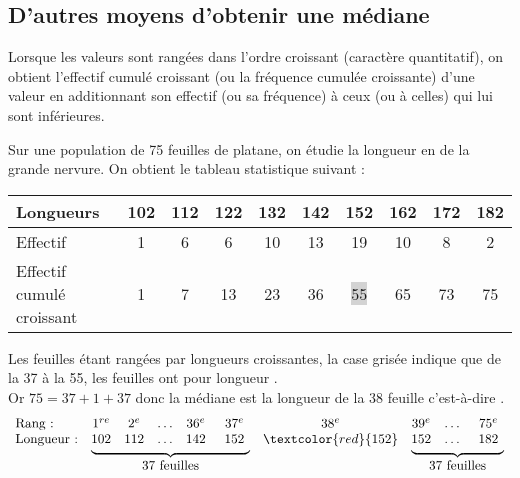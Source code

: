 \subsection{D'autres moyens d'obtenir une médiane}
\begin{exemple*1}

    Lorsque les valeurs sont rangées dans l'ordre croissant (caractère quantitatif), on obtient l'effectif cumulé croissant (ou la fréquence cumulée croissante) d'une valeur en additionnant son effectif (ou sa fréquence) à ceux (ou à celles) qui lui sont inférieures.
    \par\medskip
    Sur une population de 75 feuilles de platane, on étudie la longueur en \Lg[mm]{} de la grande nervure. On obtient le tableau  statistique suivant :\\
    \begin{center}\begin{tabular}{|m{4.5cm}|*{9}{c|}}
    \hline 
    Longueurs&102&112&122&132&142&152&162&172&182\\\hline 
    Effectif&1&6&6&10&13&19&10&8&2\\\hline
    Effectif cumulé croissant&1&7&13&23&36&\colorbox{LightGray}{55}&65&73&75\\\hline
    \end{tabular}
    \end{center}
    \smallskip
    Les feuilles étant rangées par longueurs croissantes, la case grisée indique que de la 37\ieme{} à la 55\ieme{}, les feuilles ont pour longueur .\\
    Or $75=37+1+37$ donc la médiane est la longueur de la 38\ieme{} feuille c'est-à-dire .\\
    $$\begin{array}{l*{9}{c}}
        \mbox{Rang :}&1^{re}&2^{e}&\ldots&36^{e}&37^{e}&38^{e}&39^{e}&\ldots&75^{e}\\
    \mbox{Longueur :}&102&112&\ldots&142&152&\textcolor{red}{152}&152&\ldots&182\\&
    \multicolumn{5}{c}{\overset{\underbrace{\quad\qquad\qquad\qquad\qquad\qquad\quad}_{{\mbox{37 feuilles}}}}{~}}&~&\multicolumn{3}{c}{\overset{\underbrace{\qquad\qquad\qquad\quad}_{\mbox{37 feuilles}}}{~}}
    \end{array}$$ 
\end{exemple*1}

